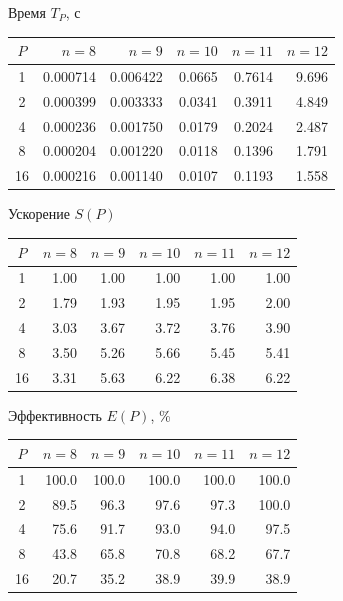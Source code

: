 \documentclass[pdf, unicode, 12pt, a4paper, oneside, fleqn]{article}
\begin{document}
\begin{center}
Время $T_P$, с

\begin{tabular}{|c|r|r|r|r|r|}
\hline
$P$ & $n=8$ & $n=9$ & $n=10$ & $n=11$ & $n=12$ \\ \hline
1  & 0.000714 & 0.006422 & 0.0665 & 0.7614 & 9.696 \\ \hline
2  & 0.000399 & 0.003333 & 0.0341 & 0.3911 & 4.849 \\ \hline
4  & 0.000236 & 0.001750 & 0.0179 & 0.2024 & 2.487 \\ \hline
8  & 0.000204 & 0.001220 & 0.0118 & 0.1396 & 1.791 \\ \hline
16 & 0.000216 & 0.001140 & 0.0107 & 0.1193 & 1.558 \\ \hline
\end{tabular}

\vspace{8pt}
Ускорение $S(P)$

\begin{tabular}{|c|r|r|r|r|r|}
\hline
$P$ & $n=8$ & $n=9$ & $n=10$ & $n=11$ & $n=12$ \\ \hline
1  & 1.00 & 1.00 & 1.00 & 1.00 & 1.00 \\ \hline
2  & 1.79 & 1.93 & 1.95 & 1.95 & 2.00 \\ \hline
4  & 3.03 & 3.67 & 3.72 & 3.76 & 3.90 \\ \hline
8  & 3.50 & 5.26 & 5.66 & 5.45 & 5.41 \\ \hline
16 & 3.31 & 5.63 & 6.22 & 6.38 & 6.22 \\ \hline
\end{tabular}

\vspace{8pt}
Эффективность $E(P)$, \%

\begin{tabular}{|c|r|r|r|r|r|}
\hline
$P$ & $n=8$ & $n=9$ & $n=10$ & $n=11$ & $n=12$ \\ \hline
1  & 100.0 & 100.0 & 100.0 & 100.0 & 100.0 \\ \hline
2  & 89.5 & 96.3 & 97.6 & 97.3 & 100.0 \\ \hline
4  & 75.6 & 91.7 & 93.0 & 94.0 & 97.5 \\ \hline
8  & 43.8 & 65.8 & 70.8 & 68.2 & 67.7 \\ \hline
16 & 20.7 & 35.2 & 38.9 & 39.9 & 38.9 \\ \hline
\end{tabular}
\end{center}
\end{document}
